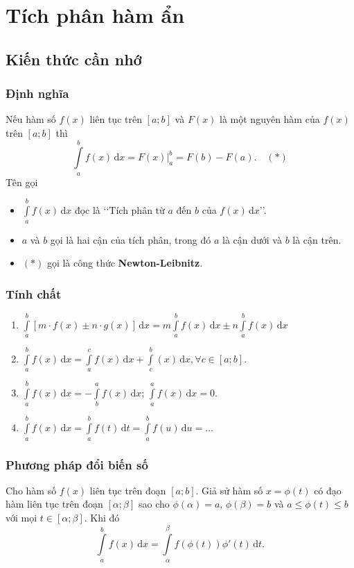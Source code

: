 \setcounter{section}{39}
\setcounter{ex}{0}
\section{Tích phân hàm ẩn}
\subsection{Kiến thức cần nhớ}
\begin{khung}
    \subsubsection{Định nghĩa}
    Nếu hàm số $f(x)$ liên tục trên $[a;b]$ và $F(x)$ là một nguyên hàm của $f(x)$ trên $[a;b]$ thì
    \[\displaystyle\int\limits_{a}^{b} f(x) \mathrm{\,d}x=F(x)\bigg|_a^b=F(b)-F(a).\quad(*) \]
Tên gọi
\begin{itemize}
    \item $\displaystyle\int\limits_{a}^{b} f(x) \mathrm{\,d}x$ đọc là \lq\lq  Tích phân từ $a$ đến $b$ của $f(x)\mathrm{\,d}x$\rq\rq.
    \item $a$ và $b$ gọi là hai cận của tích phân, trong đó $a$ là cận dưới và $b$ là cận trên.
    \item $(*)$ gọi là công thức \textbf{Newton-Leibnitz}.
\end{itemize}
\subsubsection{Tính chất}
\begin{enumerate}
    \item $\displaystyle\int\limits_a^b[m\cdot f(x)\pm n\cdot g(x)]\mathrm{\,d}x=m\displaystyle\int\limits_a^bf(x)\mathrm{\,d}x\pm n\displaystyle\int\limits_a^bf(x)\mathrm{\,d}x$
    \item $\displaystyle\int\limits_a^bf(x)\mathrm{\,d}x=\displaystyle\int\limits_a^cf(x)\mathrm{\,d}x+\displaystyle\int\limits_c^b(x)\mathrm{\,d}x,\forall c\in[a ; b]$.
    \item $\displaystyle\int\limits_{a}^bf(x)\mathrm{\,d}x=-\displaystyle\int\limits_b^af(x)\mathrm{\,d}x$; $\displaystyle\int\limits_a^af(x)\mathrm{\,d}x=0$. 
    \item $\displaystyle\int\limits_{a}^bf(x)\mathrm{\,d}x=\displaystyle\int\limits_a^b f(t)\mathrm{\,d}t=\displaystyle\int\limits_a^b f(u)\mathrm{\,d}u= \ldots$
\end{enumerate}
\subsubsection{Phương pháp đổi biến số}
Cho hàm số $f(x)$ liên tục trên đoạn $[a;b]$. Giả sử hàm số $x= \phi (t)$ có đạo hàm liên tục trên đoạn $[\alpha; \beta]$ sao cho $\phi (\alpha)=a$, $\phi (\beta)=b$ và $a \le \phi (t) \le b$ với mọi $t \in [\alpha; \beta]$. Khi đó
$$\displaystyle\int\limits_a^b f(x)\mathrm{\,d}x= \displaystyle\int\limits_{\alpha}^{\beta} f\left(\phi (t)\right) \phi'(t)\mathrm{\,d}t.$$

\end{khung}
